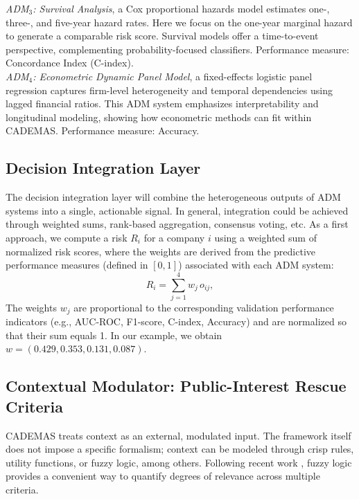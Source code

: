 \documentclass[letterpaper, 10 pt,conference]{IEEEconf}
\begin{document}
\noindent
\textit{ADM$_3$: Survival Analysis}, a Cox proportional hazards model estimates one-, three-, and five-year hazard rates. Here we focus on the one-year marginal hazard to generate a comparable risk score. Survival models offer a time-to-event perspective, complementing probability-focused classifiers. Performance measure: Concordance Index (C-index).\\

\noindent
\textit{ADM$_4$: Econometric Dynamic Panel Model}, a fixed-effects logistic panel regression captures firm-level heterogeneity and temporal dependencies using lagged financial ratios. This ADM system emphasizes interpretability and longitudinal modeling, showing how econometric methods can fit within CADEMAS. Performance measure: Accuracy.



\subsection{Decision Integration Layer}

The decision integration layer will combine the heterogeneous outputs of ADM systems into a single, actionable signal. In general, integration could be achieved through weighted sums, rank-based aggregation, consensus voting, etc. As a first approach, we compute a risk $R_i$ for a company $i$ using a weighted sum of normalized risk scores, where the weights are derived from the predictive performance measures (defined in $[0,1]$) associated with each ADM system:
\[
    R_i = \sum_{j=1}^{4} w_j \, o_{ij},
\]
\noindent
The weights \(w_j\) are proportional to the corresponding validation performance indicators (e.g., AUC-ROC, F1-score, C-index, Accuracy) and are normalized so that their sum equals 1. In our example, we obtain $w = (0.429, 0.353, 0.131, 0.087)$.

\subsection{Contextual Modulator: Public-Interest Rescue Criteria}

CADEMAS treats context as an external, modulated input. The framework itself does not impose a specific formalism; context can be modeled through crisp rules, utility functions, or fuzzy logic, among others. Following recent work \cite{PerezCanedo2022}, fuzzy logic provides a convenient way to quantify degrees of relevance across multiple criteria.
\end{document}
